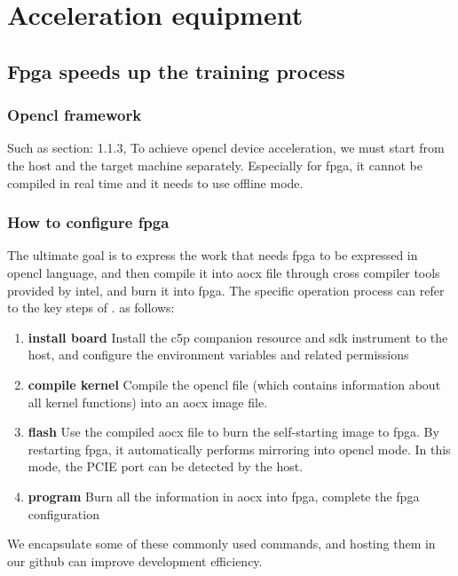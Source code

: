 \section{Acceleration equipment}
\subsection{Fpga speeds up the training process}
\subsubsection{Opencl framework}\label{sec:opencl-step}
Such as section: 1.1.3, To achieve opencl device acceleration, we must start from the host and the target machine separately. Especially for fpga, it cannot be compiled in real time and it needs to use offline mode.
\subsubsection{How to configure fpga}
The ultimate goal is to express the work that needs fpga to be expressed in opencl language, and then compile it into aocx file through cross compiler tools provided by intel, and burn it into fpga. The specific operation process can refer to the key steps of \cite{intel-opencl}. as follows:
\begin{enumerate}
  \item{\textbf{install board}} Install the c5p companion resource and sdk instrument to the host, and configure the environment variables and related permissions
  \item{\textbf{compile kernel}} Compile the opencl file (which contains information about all kernel functions) into an aocx image file.
  \item{\textbf{flash}} Use the compiled aocx file to burn the self-starting image to fpga. By restarting fpga, it automatically performs mirroring into opencl mode. In this mode, the PCIE port can be detected by the host.
  \item{\textbf{program}} Burn all the information in aocx into fpga, complete the fpga configuration
\end{enumerate}

We encapsulate some of these commonly used commands, and hosting them in our github \cite{rcClub} can improve development efficiency.

